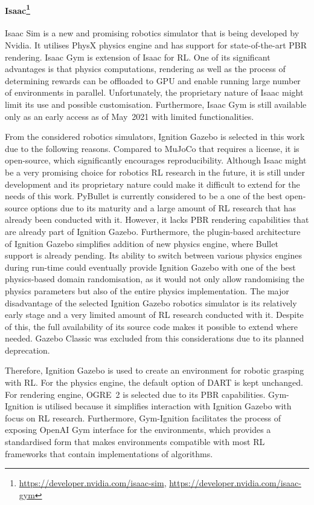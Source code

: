 \paragraph{Isaac\protect\footnote{\href{https://developer.nvidia.com/isaac-sim}{https://developer.nvidia.com/isaac-sim}, \href{https://developer.nvidia.com/isaac-gym}{https://developer.nvidia.com/isaac-gym}}} Isaac Sim is a new and promising robotics simulator that is being developed by Nvidia. It utilises PhysX physics engine and has support for state-of-the-art PBR rendering. Isaac Gym is extension of Isaac for RL. One of its significant advantages is that physics computations, rendering as well as the process of determining rewards can be offloaded to GPU and enable running large number of environments in parallel. Unfortunately, the proprietary nature of Isaac might limit its use and possible customisation. Furthermore, Isaac Gym is still available only as an early access as of May~2021 with limited functionalities.

\bigskip

From the considered robotics simulators, Ignition Gazebo is selected in this work due to the following reasons. Compared to MuJoCo that requires a license, it is open-source, which significantly encourages reproducibility. Although Isaac might be a very promising choice for robotics RL research in the future, it is still under development and its proprietary nature could make it difficult to extend for the needs of this work. PyBullet is currently considered to be a one of the best open-source options due to its maturity and a large amount of RL research that has already been conducted with it. However, it lacks PBR rendering capabilities that are already part of Ignition Gazebo. Furthermore, the plugin-based architecture of Ignition Gazebo simplifies addition of new physics engine, where Bullet support is already pending. Its ability to switch between various physics engines during run-time could eventually provide Ignition Gazebo with one of the best physics-based domain randomisation, as it would not only allow randomising the physics parameters but also of the entire physics implementation. The major disadvantage of the selected Ignition Gazebo robotics simulator is its relatively early stage and a very limited amount of RL research conducted with it. Despite of this, the full availability of its source code makes it possible to extend where needed. Gazebo Classic was excluded from this considerations due to its planned deprecation.

Therefore, Ignition Gazebo is used to create an environment for robotic grasping with RL. For the physics engine, the default option of DART is kept unchanged. For rendering engine, OGRE~2 is selected due to its PBR capabilities. Gym-Ignition \cite{ferigo_gym-ignition_2020} is utilised because it simplifies interaction with Ignition Gazebo with focus on RL research. Furthermore, Gym-Ignition facilitates the process of exposing OpenAI Gym interface for the environments, which provides a standardised form that makes environments compatible with most RL frameworks that contain implementations of algorithms.


